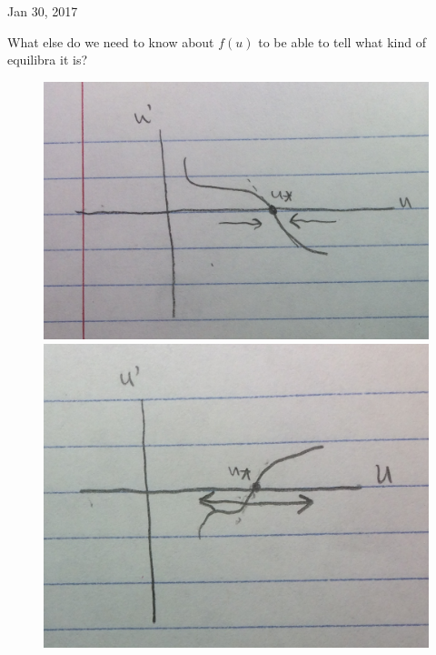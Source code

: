 \documentclass[main.tex]{subfiles}
\begin{document}
\hrulefill

Jan 30, 2017

\vspace{3mm}

What else do we need to know about $f(u)$ to be able to tell what kind of equilibra it is?

\begin{figure}
\begin{multicols}{2}
    \includegraphics[width=\linewidth]{stable-intersect}\par 
    \includegraphics[width=\linewidth]{unstable-intersect}\par 
\end{multicols}
\begin{multicols}{2}

\end{multicols}
\end{figure}
\end{document}
